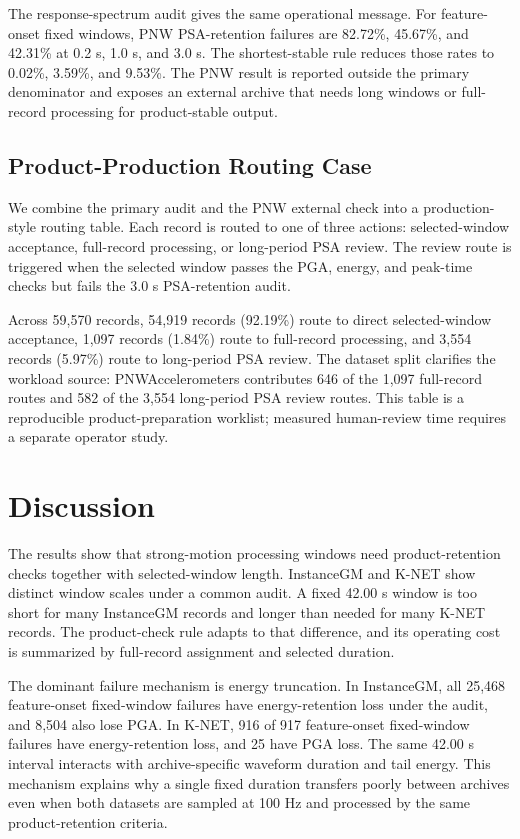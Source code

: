 \documentclass[12pt,letterpaper]{article}
\begin{document}
The response-spectrum audit gives the same operational message. For feature-onset fixed windows, PNW PSA-retention failures are 82.72\%, 45.67\%, and 42.31\% at 0.2 s, 1.0 s, and 3.0 s. The shortest-stable rule reduces those rates to 0.02\%, 3.59\%, and 9.53\%. The PNW result is reported outside the primary denominator and exposes an external archive that needs long windows or full-record processing for product-stable output.

\subsection{Product-Production Routing Case}\label{product-production-routing-case}

We combine the primary audit and the PNW external check into a production-style routing table. Each record is routed to one of three actions: selected-window acceptance, full-record processing, or long-period PSA review. The review route is triggered when the selected window passes the PGA, energy, and peak-time checks but fails the 3.0 s PSA-retention audit.

Across 59,570 records, 54,919 records (92.19\%) route to direct selected-window acceptance, 1,097 records (1.84\%) route to full-record processing, and 3,554 records (5.97\%) route to long-period PSA review. The dataset split clarifies the workload source: PNWAccelerometers contributes 646 of the 1,097 full-record routes and 582 of the 3,554 long-period PSA review routes. This table is a reproducible product-preparation worklist; measured human-review time requires a separate operator study.

\section{Discussion}\label{discussion}

The results show that strong-motion processing windows need product-retention checks together with selected-window length. InstanceGM and K-NET show distinct window scales under a common audit. A fixed 42.00 s window is too short for many InstanceGM records and longer than needed for many K-NET records. The product-check rule adapts to that difference, and its operating cost is summarized by full-record assignment and selected duration.

The dominant failure mechanism is energy truncation. In InstanceGM, all 25,468 feature-onset fixed-window failures have energy-retention loss under the audit, and 8,504 also lose PGA. In K-NET, 916 of 917 feature-onset fixed-window failures have energy-retention loss, and 25 have PGA loss. The same 42.00 s interval interacts with archive-specific waveform duration and tail energy. This mechanism explains why a single fixed duration transfers poorly between archives even when both datasets are sampled at 100 Hz and processed by the same product-retention criteria.
\end{document}
